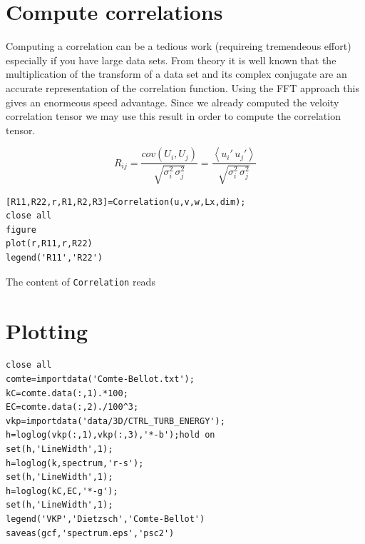 \documentclass[preprint,12pt,ntfdMod]{elsarticle}
\begin{document}
\section{Compute correlations}

\begin{par}
Computing a correlation can be a tedious work (requireing tremendeous effort) especially if you have large data sets. From theory it is well known that the multiplication of the transform of a data set and its complex conjugate are an accurate representation of the correlation function. Using the FFT approach this gives an enormeous speed advantage. Since we already computed the veloity correlation tensor we may use this result in order to compute the correlation tensor.
\end{par} \vspace{1em}
\begin{par}

  \begin{equation}
      R_{ij} = \frac{cov(U_i,U_j)}{\sqrt{\sigma_i^2\,\sigma_j^2}}
             = \frac{\left<u_i'\,u_j'\right>}{\sqrt{\sigma_i^2\,\sigma_j^2}}
  \end{equation}

\end{par} \vspace{1em}
\begin{verbatim}
[R11,R22,r,R1,R2,R3]=Correlation(u,v,w,Lx,dim);
close all
figure
plot(r,R11,r,R22)
legend('R11','R22')
\end{verbatim}
\begin{par}

The content of \verb|Correlation| reads


\end{par} \vspace{1em}
\begin{par}




\end{par} \vspace{1em}


\section{Plotting}

\begin{verbatim}
close all
comte=importdata('Comte-Bellot.txt');
kC=comte.data(:,1).*100;
EC=comte.data(:,2)./100^3;
vkp=importdata('data/3D/CTRL_TURB_ENERGY');
h=loglog(vkp(:,1),vkp(:,3),'*-b');hold on
set(h,'LineWidth',1);
h=loglog(k,spectrum,'r-s');
set(h,'LineWidth',1);
h=loglog(kC,EC,'*-g');
set(h,'LineWidth',1);
legend('VKP','Dietzsch','Comte-Bellot')
saveas(gcf,'spectrum.eps','psc2')
\end{verbatim}
\end{document}
